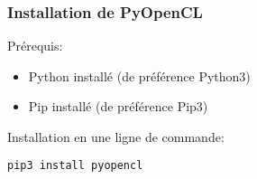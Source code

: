 \documentclass[9pt]{beamer}
\begin{document}
\begin{frame}[fragile]
    \frametitle{Installation de PyOpenCL}
    Prérequis:
    \begin{itemize}
        \item Python installé (de préférence Python3)
        \item Pip installé (de préférence Pip3)
    \end{itemize}
    \vspace{20pt}
    Installation en une ligne de commande:
    \begin{lstlisting}[language=sh]
        pip3 install pyopencl
    \end{lstlisting}
\end{frame}
\end{document}
